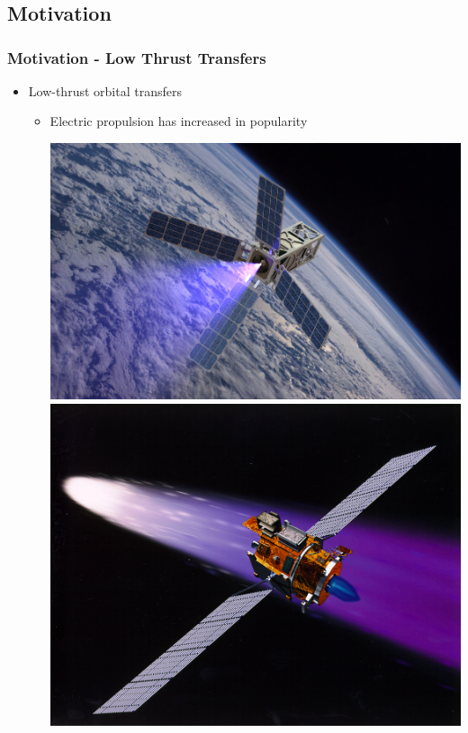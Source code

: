 
\section*{}
\subsection*{Motivation}  




\begin{frame} %
\frametitle{Motivation - Low Thrust Transfers} %
\begin{itemize}
    \item Low-thrust orbital transfers
    \begin{itemize}
        \item Electric propulsion has increased in popularity

        \includegraphics[height=0.3\textheight]{figures/2016AAS/patriot_plume.jpg}
        \hfill
        \includegraphics[height=0.3\textheight]{figures/2016AAS/deepspace1.jpg}
 

\end{itemize}
\end{itemize}
\end{frame}
